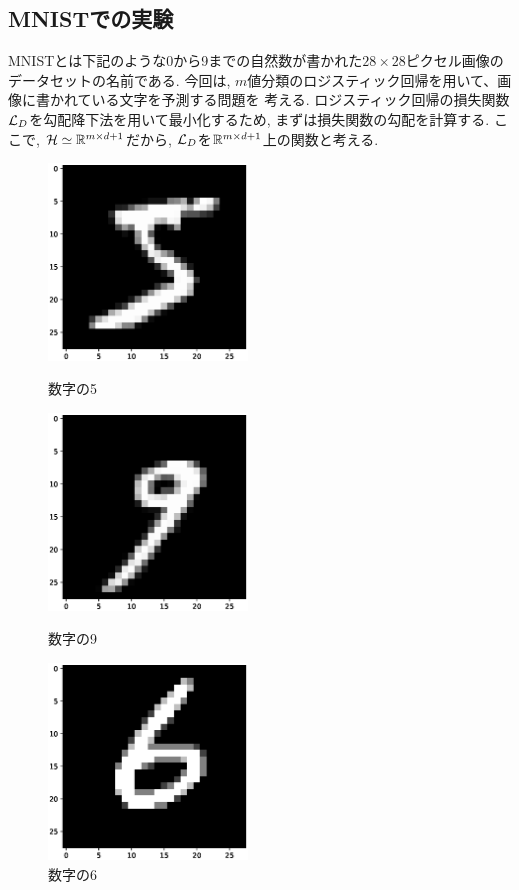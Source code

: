 \subsection{MNISTでの実験}
MNISTとは下記のような0から9までの自然数が書かれた$28\times28$ピクセル画像のデータセットの名前である. 
今回は, $m$値分類のロジスティック回帰を用いて、画像に書かれている文字を予測する問題を
考える. ロジスティック回帰の損失関数$\mathcal{L}_{D}$を勾配降下法を用いて最小化するため, まずは損失関数の勾配を計算する.
ここで, $\mathcal{H}\simeq\mathbb{R}^{m\times d + 1}$だから, $\mathcal{L}_{D}$を$\mathbb{R}^{m\times d + 1}$上の関数と考える.\
\begin{figure}[htbp]
    \begin{minipage}{0.32\hsize}
        \centering
        \includegraphics[width = 5.3cm]{Images/MNIST_sample1.eps}
        \caption{数字の5}
    \end{minipage}
    \begin{minipage}{0.32\hsize}
        \centering
        \includegraphics[width = 5.3cm]{Images/MNIST_sample2.eps}
        \caption{数字の9}
    \end{minipage}
    \begin{minipage}{0.32\hsize}
        \centering
        \includegraphics[width = 5.3cm]{Images/MNIST_sample3.eps}
        \caption{数字の6}
    \end{minipage}
\end{figure}
